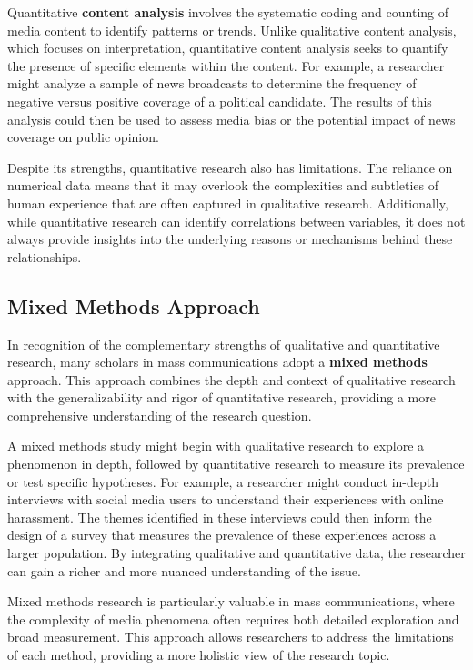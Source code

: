 \documentclass[
]{book}
\begin{document}
Quantitative \textbf{content analysis} involves the systematic coding and counting of media content to identify patterns or trends. Unlike qualitative content analysis, which focuses on interpretation, quantitative content analysis seeks to quantify the presence of specific elements within the content. For example, a researcher might analyze a sample of news broadcasts to determine the frequency of negative versus positive coverage of a political candidate. The results of this analysis could then be used to assess media bias or the potential impact of news coverage on public opinion.

Despite its strengths, quantitative research also has limitations. The reliance on numerical data means that it may overlook the complexities and subtleties of human experience that are often captured in qualitative research. Additionally, while quantitative research can identify correlations between variables, it does not always provide insights into the underlying reasons or mechanisms behind these relationships.

\subsection*{Mixed Methods Approach}\label{mixed-methods-approach}

In recognition of the complementary strengths of qualitative and quantitative research, many scholars in mass communications adopt a \textbf{mixed methods} approach. This approach combines the depth and context of qualitative research with the generalizability and rigor of quantitative research, providing a more comprehensive understanding of the research question.

A mixed methods study might begin with qualitative research to explore a phenomenon in depth, followed by quantitative research to measure its prevalence or test specific hypotheses. For example, a researcher might conduct in-depth interviews with social media users to understand their experiences with online harassment. The themes identified in these interviews could then inform the design of a survey that measures the prevalence of these experiences across a larger population. By integrating qualitative and quantitative data, the researcher can gain a richer and more nuanced understanding of the issue.

Mixed methods research is particularly valuable in mass communications, where the complexity of media phenomena often requires both detailed exploration and broad measurement. This approach allows researchers to address the limitations of each method, providing a more holistic view of the research topic.
\end{document}
